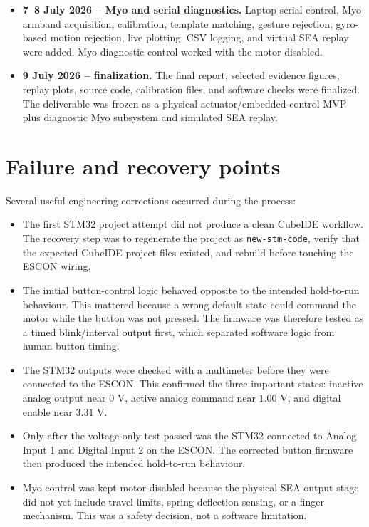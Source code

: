 \documentclass[11pt,a4paper]{report}
\begin{document}
\begin{itemize}
  \item \textbf{7--8 July 2026 -- Myo and serial diagnostics.} Laptop serial control, Myo armband acquisition, calibration, template matching, gesture rejection, gyro-based motion rejection, live plotting, CSV logging, and virtual SEA replay were added. Myo diagnostic control worked with the motor disabled.
  \item \textbf{9 July 2026 -- finalization.} The final report, selected evidence figures, replay plots, source code, calibration files, and software checks were finalized. The deliverable was frozen as a physical actuator/embedded-control MVP plus diagnostic Myo subsystem and simulated SEA replay.
\end{itemize}

\section{Failure and recovery points}

Several useful engineering corrections occurred during the process:

\begin{itemize}
  \item The first STM32 project attempt did not produce a clean CubeIDE workflow. The recovery step was to regenerate the project as \texttt{new-stm-code}, verify that the expected CubeIDE project files existed, and rebuild before touching the ESCON wiring.
  \item The initial button-control logic behaved opposite to the intended hold-to-run behaviour. This mattered because a wrong default state could command the motor while the button was not pressed. The firmware was therefore tested as a timed blink/interval output first, which separated software logic from human button timing.
  \item The STM32 outputs were checked with a multimeter before they were connected to the ESCON. This confirmed the three important states: inactive analog output near $0$ V, active analog command near $1.00$ V, and digital enable near $3.31$ V.
  \item Only after the voltage-only test passed was the STM32 connected to Analog Input 1 and Digital Input 2 on the ESCON. The corrected button firmware then produced the intended hold-to-run behaviour.
  \item Myo control was kept motor-disabled because the physical SEA output stage did not yet include travel limits, spring deflection sensing, or a finger mechanism. This was a safety decision, not a software limitation.
\end{itemize}
\end{document}
